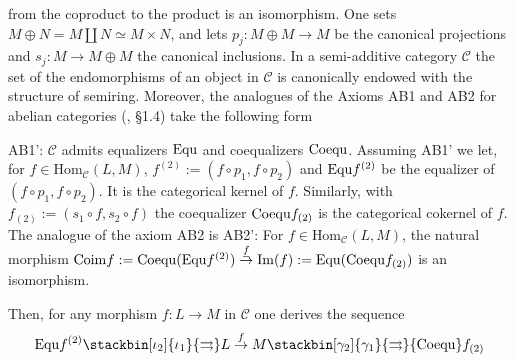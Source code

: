 \documentclass[12pt]{article}
\def\Hom{{\rm Hom}}
\def\id{{\rm id}}
\def\equ{{\rm Equ}}
\def\coequ{{\rm Coequ}}
\def\im{{\rm Im}}
\def\mC{{\mathscr C}}
\def\id{{\mbox{Id}}}
\def\Hom {{\mbox{Hom}}}
\def\coim{{\rm Coim}}
\begin{document}
from the coproduct  to the product 
 is an isomorphism.
One sets $M\oplus N=M \amalg N\simeq M\times N$, and  lets $p_j:M \oplus M\to M$ be the canonical projections and $s_j:M\to M\oplus M$  the canonical inclusions. In a semi-additive category $\mC$ the set of the endomorphisms  of an object in $\mC$ is canonically endowed with the structure of semiring. Moreover,  the analogues of the Axioms AB1 and AB2 for abelian categories (\!\cite{Grtohoku}, \S 1.4) take the following form\vspace{0.2cm}

	AB1': $\mC$ admits equalizers $\equ$ and coequalizers $\coequ$. \newline
	Assuming AB1' we let, for $f\in \Hom_\mC(L,M)$, $
f^{(2)}:=(f\circ p_1,f\circ p_2)
$ and $\equ f^{(2)}$ be the equalizer of $(f\circ p_1,f\circ p_2)$. It is  the categorical kernel of $f$. Similarly, with $
f_{(2)}:=(s_1\circ f,s_2\circ f)
$ the coequalizer  $\coequ f_{(2)}$ is the categorical cokernel of $f$. The analogue of the axiom AB2 is\newline
	AB2': For $f\in \Hom_\mC(L,M)$, the natural morphism $\coim f:=\coequ(\equ f^{(2)})\stackrel{\underline f}{\to} \im(f):=\equ(\coequ f_{(2)})$ is an isomorphism. 


 Then, for any morphism $f:L\to M$ in $\mC$ one derives the sequence
\begin{equation}\label{defncokergenintro}
	\equ f^{(2)} \stackbin[\iota_2]{\iota_1}{\rightrightarrows} L\stackrel{f}{\to} M \stackbin[\gamma_2]{\gamma_1}{\rightrightarrows}\coequ f_{(2)}
\end{equation}
\end{document}
